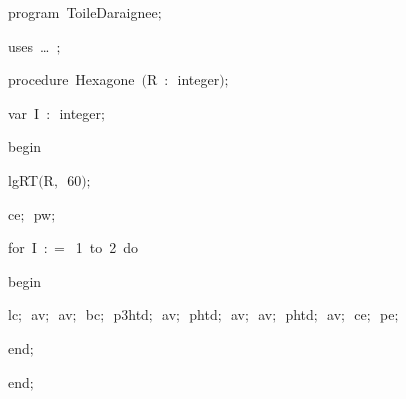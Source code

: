 
{
\parindent {}
\medskip

\carrenoir
\vspace{\neglskip}\mbox{\blc  \idt  \mcl program\idt \ ToileDaraignee$;$
}\par 
\vspace{\neglskip}\mbox{\blc \blk\idt \mcl uses\idt \ \ldots\ $;$
}\par 
\medskip

\pagebreak[3] 
\vspace{\neglskip}\mbox{\blc  \blk\idt  \mcl procedure\idt \ Hexagone\ $($R\ $:$\ integer$)$$;$}\par 
\pagebreak[3] 
\vspace{\neglskip}\mbox{\blc  \blk\blk\idt  \mcl var\idt \ I\ $:$\ integer$;$}\par 
\vspace{\neglskip}\mbox{\blc  \blk\idt  \mcl begin\idt }\par 
\vspace{\neglskip}\mbox{\blc  \blk\blk\idt  lgRT$($R$,$\ 60$)$$;$}\par 
\vspace{\neglskip}\mbox{\blc  \blk\blk\idt  ce$;$\ pw$;$}\par 
\pagebreak[3] 
\vspace{\neglskip}\mbox{\blc  \blk\blk\idt  \mcl for\idt \ I\ $:$$=$\ 1\ \mcl to\idt \ 2\ \mcl do\idt }\par 
\vspace{\neglskip}\mbox{\blc  \blk\blk\blk\idt  \mcl begin\idt }\par 
\vspace{\neglskip}\mbox{\blc  \blk\blk\blk\blk\idt  lc$;$\ av$;$\ av$;$\ bc$;$\ p3htd$;$\ av$;$\ phtd$;$\ av$;$\ av$;$\ phtd$;$\ av$;$\ ce$;$\ pe$;$}\par 
\vspace{\neglskip}\mbox{\blc  \blk\blk\blk\idt  \mcl end\idt $;$\ }\par 
\vspace{\neglskip}\mbox{\blc  \blk\idt  \mcl end\idt $;$}\par 
\medskip

}
